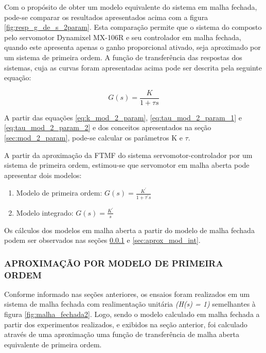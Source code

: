 \documentclass[12pt,oneside,a4paper, chapter=TITLE, section = TITLE, english, brazil]{abntex2}
\begin{document}
Com o propósito de obter um modelo equivalente do sistema em malha fechada, pode-se comparar os resultados apresentados acima com a figura \ref{fig:resp_g_de_s_2param}. Esta comparação permite que o sistema do composto pelo servomotor Dynamixel MX-106R e seu controlador em malha fechada, quando este apresenta apenas o ganho proporcional ativado, seja aproximado por um sistema de primeira ordem. A função de transferência das respostas dos sistemas, cuja as curvas foram apresentadas acima pode ser descrita pela seguinte equação:

\begin{equation}
G(s) = \frac{K}{1 + \tau s} \label{eq:g_s_1_ordem_MF}
\end{equation}

A partir das equações \ref{eq:k_mod_2_param}, \ref{eq:tau_mod_2_param_1} e \ref{eq:tau_mod_2_param_2} e dos conceitos apresentados na seção \ref{sec:mod_2_param}, pode-se calcular os parâmetros K e $\tau$.

A partir da aproximação da FTMF do sistema servomotor-controlador por um sistema de primeira ordem, estimou-se que servomotor em malha aberta pode apresentar dois modelos:

\begin{enumerate}

\item Modelo de primeira ordem:
$G(s) = \frac{K^{'}}{1 + \tau^{'} s}$

\item Modelo integrado:
$G(s) = \frac{K^{'}}{s}$

\end{enumerate}

Os cálculos dos modelos em malha aberta a partir do modelo de malha fechada podem ser observados nas seções \ref{sec:aprox_mod_1_ord} e \ref{sec:aprox_mod_int}.

\subsubsection{APROXIMAÇÃO POR MODELO DE PRIMEIRA ORDEM} \label{sec:aprox_mod_1_ord}

Conforme informado nas seções anteriores, os ensaios foram realizados em um sistema de malha fechada com realimentação unitária \textit{(H(s) = 1)} semelhantes à figura \ref{fig:malha_fechada2}. Logo, sendo o modelo calculado em malha fechada a partir dos experimentos realizados, e exibidos na seção anterior, foi calculado através de uma aproximação uma função de transferência de malha aberta equivalente de primeira ordem.
\end{document}
